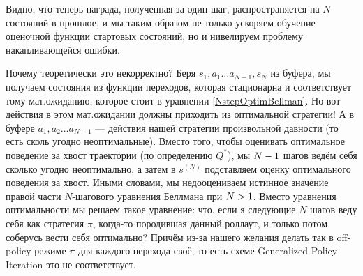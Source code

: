 Видно, что теперь награда, полученная за один шаг, распространяется на $N$ состояний в прошлое, и мы таким образом не только ускоряем обучение оценочной функции стартовых состояний, но и нивелируем проблему накапливающейся ошибки. 

Почему теоретически это некорректно? Беря $s_1, a_1 \dots a_{N-1}, s_N$ из буфера, мы получаем состояния из функции переходов, которая стационарна и соответствует тому мат.ожиданию, которое стоит в уравнении \eqref{NstepOptimBellman}. Но вот действия в этом мат.ожидании должны приходить из оптимальной стратегии! А в буфере $a_1, a_2 \dots a_{N-1}$ --- действия нашей стратегии произвольной давности (то есть сколь угодно неоптимальные). Вместо того, чтобы оценивать оптимальное поведение за хвост траектории (по определению $Q^*$), мы $N \HM- 1$ шагов ведём себя сколько угодно неоптимально, а затем в $s^{(N)}$ подставляем оценку оптимального поведения за хвост. Иными словами, мы недооцениваем истинное значение правой части $N$-шагового уравнения Беллмана при $N \HM> 1$. Вместо уравнения оптимальности мы решаем такое уравнение: что, если я следующие $N$ шагов веду себя как стратегия $\pi$, когда-то породившая данный роллаут, и только потом соберусь вести себя оптимально? Причём из-за нашего желания делать так в off-policy режиме $\pi$ для каждого перехода своё, то есть схеме Generalized Policy Iteration это не соответствует.

